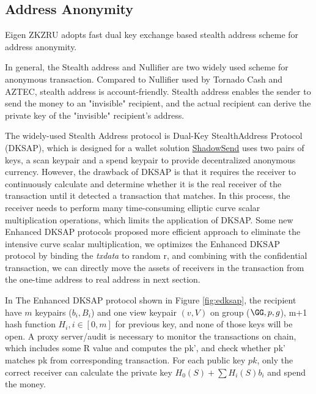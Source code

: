 
\subsection{Address Anonymity}

Eigen ZKZRU adopts fast dual key exchange based stealth address scheme for address anonymity. 

In general, the Stealth address and Nullifier are two widely used scheme for anonymous
transaction. Compared to Nullifier used by Tornado Cash and AZTEC, stealth address is account-friendly. Stealth address enables the sender to send the money to an "invisible" recipient, and the actual recipient can derive the private key of the "invisible" recipient's address. 

The widely-used Stealth Address protocol is Dual-Key StealthAddress Protocol (DKSAP), which is designed for a wallet solution \href{https://github.com/shadowproject}{ShadowSend} uses two pairs of keys, a scan keypair and a spend keypair to provide decentralized anonymous currency. However, the drawback of DKSAP is that it requires the receiver to continuously calculate and determine whether it is the real receiver of the transaction until it detected a transaction that matches. In this process, the receiver needs to perform many time-consuming elliptic curve scalar multiplication operations, which limits the application of DKSAP. Some new Enhanced DKSAP protocols \cite{courtois2017stealth} proposed more efficient approach to eliminate the intensive curve scalar multiplication, we optimizes the Enhanced DKSAP protocol by binding the \textit{txdata} to random r, and combining with the confidential transaction, we can directly move the assets of receivers in the transaction from the one-time address to real address in next section. 

In The Enhanced DKSAP protocol shown in Figure \ref{fig:edksap}, the recipient have $m$ keypairs ($b_i, B_i$) and one view keypair $(v, V)$ on group ($\GG, p, g$), m+1 hash function $H_i, i \in [0, m]$ for previous key, and none of those keys will be open. A proxy server/audit is necessary to monitor the transactions on chain, which includes some R value and computes the pk', and check whether pk' matches pk from corresponding transaction. For each public key $pk$, only the correct receiver can calculate the private key $H_0(S)+\sum{H_i(S)b_i}$ and spend the money. 

